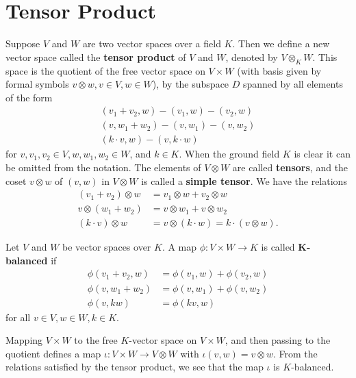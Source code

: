 \section{Tensor Product}
\begin{defn}
Suppose $V$ and $W$ are two vector spaces over a field $K$. Then we define a new vector space called the \textbf{tensor product} of $V$ and $W$, denoted by $V \otimes_{K} W$.  This space is the quotient of the free vector space on $V \times W$ (with basis given by formal symbols $v \otimes w, v\in V, w \in W$), by the subspace $D$ spanned by all elements of the form
\begin{align*}
(v_1 + v_2, w) - (v_1 , w) - (v_2 , w) \\
(v , w_1 + w_2) - (v , w_1) - (v , w_2) \\
(k \cdot v , w) -( v , k \cdot w)
\end{align*}
for $v, v_1, v_2 \in V, w, w_1, w_2 \in W$, and $k \in K$. When the ground field $K$ is clear it can be omitted from the notation.  The elements of $V \otimes W$ are called \textbf{tensors}, and the coset $v \otimes w$ of $(v,w)$ in $V \otimes W$ is called a \textbf{simple tensor}.  We have the relations
\begin{align*}
(v_1 + v_2) \otimes w &= v_1 \otimes w + v_2 \otimes w \\
v \otimes (w_1 + w_2) &= v \otimes w_1 + v \otimes w_2 \\
(k \cdot v) \otimes w &= v \otimes (k \cdot w) = k \cdot (v \otimes w).
\end{align*}
\end{defn}

\begin{defn}
Let $V$ and $W$ be vector spaces over $K$.  A map $\phi \colon V \times W \to K$ is called $\mathbf{K}$\textbf{-balanced} if \begin{align*}
\phi( v_1 + v_2, w) &= \phi(v_1, w) + \phi(v_2, w) \\
\phi(v, w_1 + w_2) &= \phi (v, w_1) + \phi(v, w_2) \\
\phi(v, kw) &= \phi( kv, w)
\end{align*}
for all $v \in V, w \in W, k \in K$.
\end{defn}
\begin{example}
Mapping $V \times W$ to the free $K$-vector space on $V \times W$, and then passing to the quotient defines a map $\iota \colon V \times W \to V \otimes W$ with $\iota (v,w) = v \otimes w$.  From the relations satisfied by the tensor product, we see that the map $\iota$ is $K$-balanced.
\end{example}

